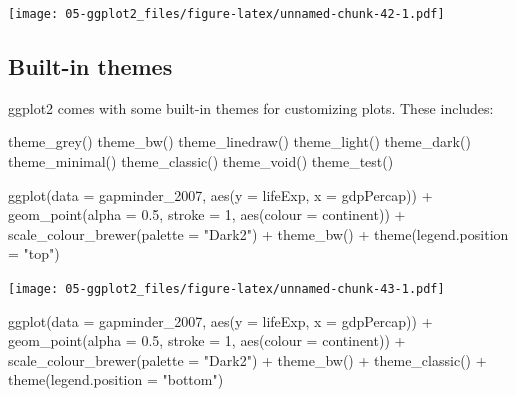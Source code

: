 \documentclass[
]{book}
\newenvironment{Shaded}{\begin{snugshade}}{\end{snugshade}}
\newcommand{\AttributeTok}[1]{\textcolor[rgb]{0.77,0.63,0.00}{#1}}
\newcommand{\DecValTok}[1]{\textcolor[rgb]{0.00,0.00,0.81}{#1}}
\newcommand{\FloatTok}[1]{\textcolor[rgb]{0.00,0.00,0.81}{#1}}
\newcommand{\FunctionTok}[1]{\textcolor[rgb]{0.00,0.00,0.00}{#1}}
\newcommand{\NormalTok}[1]{#1}
\newcommand{\SpecialCharTok}[1]{\textcolor[rgb]{0.00,0.00,0.00}{#1}}
\newcommand{\StringTok}[1]{\textcolor[rgb]{0.31,0.60,0.02}{#1}}
\begin{document}
\texttt{[image: 05-ggplot2\_files/figure-latex/unnamed-chunk-42-1.pdf]}

\hypertarget{built-in-themes}{%
\subsection{Built-in themes}\label{built-in-themes}}

ggplot2 comes with some built-in themes for customizing plots. These includes:

theme\_grey()
theme\_bw()
theme\_linedraw()
theme\_light()
theme\_dark()
theme\_minimal()
theme\_classic()
theme\_void()
theme\_test()

\begin{Shaded}
\begin{Highlighting}[]
\FunctionTok{ggplot}\NormalTok{(}\AttributeTok{data =}\NormalTok{ gapminder\_2007, }\FunctionTok{aes}\NormalTok{(}\AttributeTok{y =}\NormalTok{ lifeExp, }\AttributeTok{x =}\NormalTok{ gdpPercap)) }\SpecialCharTok{+} 
  \FunctionTok{geom\_point}\NormalTok{(}\AttributeTok{alpha =} \FloatTok{0.5}\NormalTok{, }\AttributeTok{stroke =} \DecValTok{1}\NormalTok{, }\FunctionTok{aes}\NormalTok{(}\AttributeTok{colour =}\NormalTok{ continent)) }\SpecialCharTok{+}
  \FunctionTok{scale\_colour\_brewer}\NormalTok{(}\AttributeTok{palette =} \StringTok{"Dark2"}\NormalTok{) }\SpecialCharTok{+}
  \FunctionTok{theme\_bw}\NormalTok{() }\SpecialCharTok{+}
  \FunctionTok{theme}\NormalTok{(}\AttributeTok{legend.position =} \StringTok{"top"}\NormalTok{)}
\end{Highlighting}
\end{Shaded}

\texttt{[image: 05-ggplot2\_files/figure-latex/unnamed-chunk-43-1.pdf]}

\begin{Shaded}
\begin{Highlighting}[]
\FunctionTok{ggplot}\NormalTok{(}\AttributeTok{data =}\NormalTok{ gapminder\_2007, }\FunctionTok{aes}\NormalTok{(}\AttributeTok{y =}\NormalTok{ lifeExp, }\AttributeTok{x =}\NormalTok{ gdpPercap)) }\SpecialCharTok{+} 
  \FunctionTok{geom\_point}\NormalTok{(}\AttributeTok{alpha =} \FloatTok{0.5}\NormalTok{, }\AttributeTok{stroke =} \DecValTok{1}\NormalTok{, }\FunctionTok{aes}\NormalTok{(}\AttributeTok{colour =}\NormalTok{ continent)) }\SpecialCharTok{+}
  \FunctionTok{scale\_colour\_brewer}\NormalTok{(}\AttributeTok{palette =} \StringTok{"Dark2"}\NormalTok{) }\SpecialCharTok{+}
  \FunctionTok{theme\_bw}\NormalTok{() }\SpecialCharTok{+}
  \FunctionTok{theme\_classic}\NormalTok{() }\SpecialCharTok{+}
  \FunctionTok{theme}\NormalTok{(}\AttributeTok{legend.position =} \StringTok{"bottom"}\NormalTok{)}
\end{Highlighting}
\end{Shaded}
\end{document}
